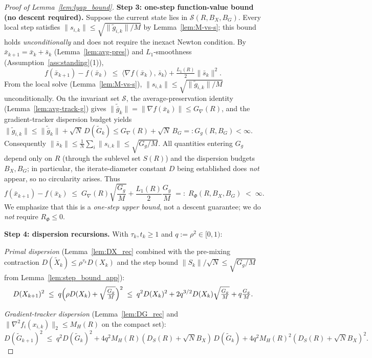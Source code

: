 \documentclass[11pt,a4paper]{article}
\begin{document}
\begin{proof}[Proof of Lemma~\ref{lem:lyap_bound}]
\smallskip
\noindent\textbf{Step 3: one-step function-value bound (no descent required).}
Suppose the current state lies in $\mathcal S(R,B_X,B_G)$.
Every local step satisfies $\|s_{i,k}\|\le\sqrt{\|\tilde g_{i,k}\|/M}$
by Lemma~\ref{lem:M-vs-s}; this bound holds \emph{unconditionally}
and does not require the inexact Newton condition.
By $\bar x_{k+1}=\bar x_k+\bar s_k$ (Lemma~\ref{lem:avg-pres}) and
$L_1$-smoothness (Assumption~\ref{ass:standing}(1)),
\[
  f(\bar x_{k+1})-f(\bar x_k)
  \;\le\;
  \langle \nabla f(\bar x_k),\,\bar s_k\rangle
  +\tfrac{L_1(R)}{2}\|\bar s_k\|^2.
\]
From the local solve (Lemma~\ref{lem:M-vs-s}),
$\|s_{i,k}\|\le\sqrt{\|\tilde g_{i,k}\|/M}$ unconditionally.
On the invariant set $\mathcal S$, the average-preservation identity
(Lemma~\ref{lem:avg-track-g}) gives
$\|\tilde{\bar g}_k\|=\|\nabla f(\bar x_k)\|\le G_\nabla(R)$,
and the gradient-tracker dispersion budget yields
$\|\tilde g_{i,k}\|\le \|\tilde{\bar g}_k\|+\sqrt{N}\,D(\tilde G_k)
\le G_\nabla(R)+\sqrt{N}\,B_G=:G_g(R,B_G)<\infty$.
Consequently $\|\bar s_k\|\le\frac{1}{N}\sum_i\|s_{i,k}\|
\le\sqrt{G_g/M}$.
All quantities entering $G_g$ depend only on $R$ (through the
sublevel set $S(R)$) and the dispersion budgets $B_X,B_G$;
in particular, the iterate-diameter constant $D$ being established
does \emph{not} appear, so no circularity arises.
Thus
\begin{equation}\label{eq:rphi_R}
  f(\bar x_{k+1})-f(\bar x_k)
  \;\le\;
  G_\nabla(R)\sqrt{\frac{G_g}{M}}+\frac{L_1(R)}{2}\frac{G_g}{M}
  \;=:\; R_\Phi(R,B_X,B_G) \;<\;\infty.
\end{equation}
We emphasize that this is a \emph{one-step upper bound}, not a descent
guarantee; we do \emph{not} require $R_\Phi\le 0$.

\smallskip
\noindent\textbf{Step 4: dispersion recursions.}
With $\tau_k,t_k\ge1$ and $q:=\rho^2\in[0,1)$:

\emph{Primal dispersion} (Lemma~\ref{lem:DX_rec} combined with the
pre-mixing contraction $D(\tilde X_k)\le \rho^{\tau_k}D(X_k)$ and the
step bound $\|S_k\|/\sqrt{N}\le \sqrt{G_g/M}$ from
Lemma~\ref{lem:step_bound_app}):
\[
  D(X_{k+1})^2
  \;\le\; q\Bigl(\rho D(X_k)+\sqrt{\tfrac{G_g}{M}}\Bigr)^2
  \;\le\; q^2 D(X_k)^2 + 2q^{3/2}D(X_k)\sqrt{\tfrac{G_g}{M}}+q\tfrac{G_g}{M}.
\]

\emph{Gradient-tracker dispersion} (Lemma~\ref{lem:DG_rec}
and $\|\nabla^2 f_i(x_{i,k})\|_2\le M_H(R)$ on the compact set):
\[
  D(\tilde G_{k+1})^2
  \;\le\; q^2 D(\tilde G_k)^2
  + 4q^2 M_H(R)(D_S(R){+}\sqrt{N}B_X)\,D(\tilde G_k)
  + 4q^2 M_H(R)^2(D_S(R){+}\sqrt{N}B_X)^2.
\]


\end{proof}
\end{document}
